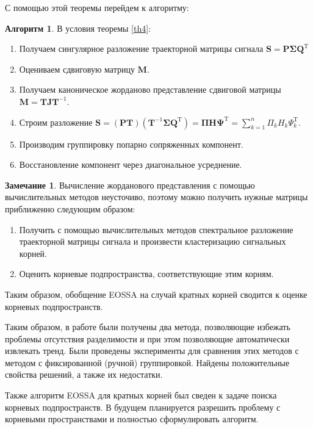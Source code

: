 \documentclass[specialist,
               substylefile = spbu_report.rtx,
               subf,href,colorlinks=true, 12pt]{disser}
\theoremstyle{definition}
\newtheorem{algorithm}{Алгоритм}
\newtheorem{remark}{Замечание}
\begin{document}
С помощью этой теоремы перейдем к алгоритму:

\begin{algorithm} В условия теоремы \ref{th4}:
\begin{enumerate}
            \item Получаем сингулярное разложение траекторной матрицы сигнала $\mathbf{S} = \mathbf{P\Sigma Q}^{\mathrm{T}}$
            \item Оцениваем сдвиговую матрицу $\mathbf{M}$.
            \item Получаем каноническое жорданово представление сдвиговой матрицы $\mathbf{M} = \mathbf{TJ}\mathbf{T}^{-1}$.
            \item Строим разложение $\mathbf{S} = (\mathbf{PT})(\mathbf{T}^{-1}\mathbf{\Sigma Q}^{\mathrm{T}}) = \mathbf{\Pi H \Psi}^{\mathrm{T}} = \sum_{k = 1}^{n}\Pi_k H_k\Psi^{\mathrm{T}}_k$.
            \item Производим группировку попарно сопряженных компонент.
            \item Восстановление компонент через диагональное усреднение. 
        \end{enumerate}
\end{algorithm}

\begin{remark}
 Вычисление жорданового представления с помощью вычислительных методов неусточиво, поэтому можно получить нужные матрицы приближенно следующим образом:
 \begin{enumerate}
     \item Получить с помощью вычислительных методов спектральное разложение траекторной матрицы сигнала и произвести кластеризацию сигнальных корней.
     \item Оценить корневые подпространства, соответствующие этим корням.
 \end{enumerate}
 Таким образом, обобщение EOSSA на случай кратных корней сводится к оценке корневых подпространств.
\end{remark}

\conclusion

Таким образом, в работе были получены два метода, позволяющие избежать проблемы отсутствия разделимости и при этом позволяющие автоматически извлекать тренд. Были проведены эксперименты для сравнения этих методов с методом с фиксированной (ручной) группировкой. Найдены положительные свойства решений, а также их недостатки.

Также алгоритм EOSSA для кратных корней был сведен к задаче поиска корневых подпространств. В будущем планируется разрешить проблему с корневыми пространствами и полностью сформулировать алгоритм.
\end{document}

